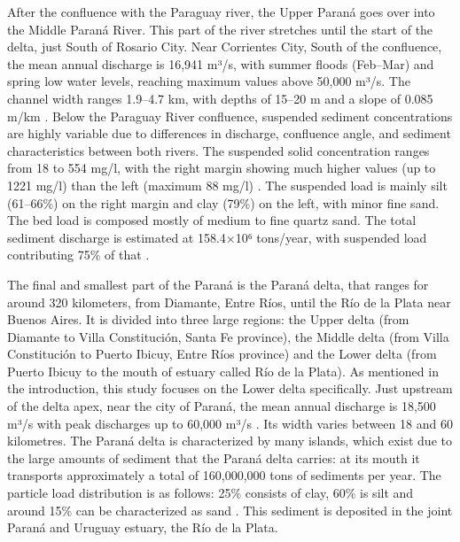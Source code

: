 After the confluence with the Paraguay river, the Upper Paraná goes over into the Middle Paraná River. This part of the river stretches until the start of the delta, just South of Rosario City. Near Corrientes City, South of the confluence, the mean annual discharge is 16,941 m³/s, with summer floods (Feb–Mar) and spring low water levels, reaching maximum values above 50,000 m³/s. The channel width ranges 1.9–4.7 km, with depths of 15–20 m and a slope of 0.085 m/km \autocite{orfeoHydraulicMorphologicalCharacteristics2002}. Below the Paraguay River confluence, suspended sediment concentrations are highly variable due to differences in discharge, confluence angle, and sediment characteristics between both rivers. The suspended solid concentration ranges from 18 to 554 mg/l, with the right margin showing much higher values (up to 1221 mg/l) than the left (maximum 88 mg/l)  \autocite{depetrisSuspendedLoadRio1968}. The suspended load is mainly silt (61–66\%) on the right margin and clay (79\%) on the left, with minor fine sand. The bed load is composed mostly of medium to fine quartz sand. The total sediment discharge is estimated at 158.4×10⁶ tons/year, with suspended load contributing 75\% of that \autocite{orfeoHydraulicMorphologicalCharacteristics2002}.

The final and smallest part of the Paraná is the Paraná delta, that ranges for around 320 kilometers, from Diamante, Entre Ríos, until the Río de la Plata near Buenos Aires. It is divided into three large regions: the Upper delta (from Diamante to Villa Constitución, Santa Fe province), the Middle delta (from Villa Constitución to Puerto Ibicuy, Entre Ríos province) and the Lower delta (from Puerto Ibicuy to the mouth of estuary called Río de la Plata). As mentioned in the introduction, this study focuses on the Lower delta specifically. Just upstream of the delta apex, near the city of Paraná, the mean annual discharge is 18,500 m³/s with peak discharges up to 60,000 m³/s \autocite{westerHydrodynamicModellingTidal2018}. Its width varies between 18 and 60 kilometres. The Paraná delta is characterized by many islands, which exist due to the large amounts of sediment that the Paraná delta carries: at its mouth it transports approximately a total of 160,000,000 tons of sediments per year. The particle load distribution is as follows: 25\% consists of clay, 60\% is silt and around 15\% can be characterized as sand \autocite{academialabParanaDelta}. This sediment is deposited in the joint Paraná and Uruguay estuary, the Río de la Plata.


